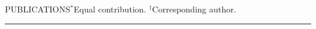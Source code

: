 \documentclass{resume} %
\renewenvironment{rSection}[2][]{
\vspace{-0.5 em} %
\sectionskip
\noindent\textcolor{RoyalPurple}{\MakeUppercase{#2}}\hfill{\footnotesize #1}\par
\sectionlineskip
\hrule
\begin{list}{}{
\setlength{\leftmargin}{1.5em}
}
\item[]
}{
\end{list}
}
\begin{document}
\begin{rSection}[$^{*}$Equal contribution. $^{\dagger}$Corresponding author.]{Publications}
%
%
%
%
%

\end{rSection}


\end{document}
